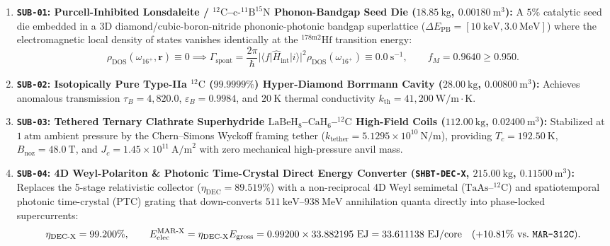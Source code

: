 \documentclass[11pt,onecolumn]{article}
\begin{document}
\begin{enumerate}
    \item \textbf{\texttt{SUB-01}: Purcell-Inhibited Lonsdaleite / $^{12}\text{C}$--$\text{c-}^{11}\text{B}^{15}\text{N}$ Phonon-Bandgap Seed Die ($18.85~\mathrm{kg}$, $0.00180~\mathrm{m}^3$):} A $5\%$ catalytic seed die embedded in a 3D diamond/cubic-boron-nitride phononic-photonic bandgap superlattice ($\Delta E_{\text{PB}} = [10~\text{keV}, 3.0~\text{MeV}]$) where the electromagnetic local density of states vanishes identically at the $^{178\text{m2}}\text{Hf}$ transition energy:
    \begin{equation}
    \rho_{\text{DOS}}(\omega_{16^+}, \mathbf{r}) \equiv 0 \implies \Gamma_{\text{spont}} = \frac{2\pi}{\hbar}|\langle f | \hat{H}_{\text{int}} | i \rangle|^2 \rho_{\text{DOS}}(\omega_{16^+}) \equiv 0.0~\mathrm{s}^{-1}, \qquad f_M = 0.9640 \ge 0.950.
    \label{eq:mar312x_purcell}
    \end{equation}
    \item \textbf{\texttt{SUB-02}: Isotopically Pure Type-IIa $^{12}\text{C}$ ($99.9999\%$) Hyper-Diamond Borrmann Cavity ($28.00~\mathrm{kg}$, $0.00800~\mathrm{m}^3$):} Achieves anomalous transmission $\tau_B = 4{,}820.0$, $\varepsilon_B = 0.9984$, and $20~\text{K}$ thermal conductivity $k_{\text{th}} = 41{,}200~\text{W/m}\cdot\text{K}$.
    \item \textbf{\texttt{SUB-03}: Tethered Ternary Clathrate Superhydride $\text{LaBeH}_8$--$\text{CaH}_6$--$^{12}\text{C}$ High-Field Coils ($112.00~\mathrm{kg}$, $0.02400~\mathrm{m}^3$):} Stabilized at $1~\text{atm}$ ambient pressure by the Chern--Simons Wyckoff framing tether ($k_{\text{tether}} = 5.1295\times 10^{10}~\text{N/m}$), providing $T_c = 192.50~\text{K}$, $B_{\text{noz}} = 48.0~\text{T}$, and $J_c = 1.45\times 10^{11}~\text{A/m}^2$ with zero mechanical high-pressure anvil mass.
    \item \textbf{\texttt{SUB-04}: 4D Weyl-Polariton \& Photonic Time-Crystal Direct Energy Converter (\texttt{SHBT-DEC-X}, $215.00~\mathrm{kg}$, $0.11500~\mathrm{m}^3$):} Replaces the 5-stage relativistic collector ($\eta_{\text{DEC}} = 89.519\%$) with a non-reciprocal 4D Weyl semimetal ($\text{TaAs}$--$^{12}\text{C}$) and spatiotemporal photonic time-crystal (PTC) grating that down-converts $511~\text{keV}$--$938~\text{MeV}$ annihilation quanta directly into phase-locked supercurrents:
    \begin{equation}
    \eta_{\text{DEC-X}} = 99.200\%, \qquad E_{\text{elec}}^{\text{MAR-X}} = \eta_{\text{DEC-X}} E_{\text{gross}} = 0.99200 \times 33.882195~\text{EJ} = 33.611138~\text{EJ/core} \quad (+10.81\%\text{ vs.\ \texttt{MAR-312C}}).

\end{equation}
\end{enumerate}
\end{document}
